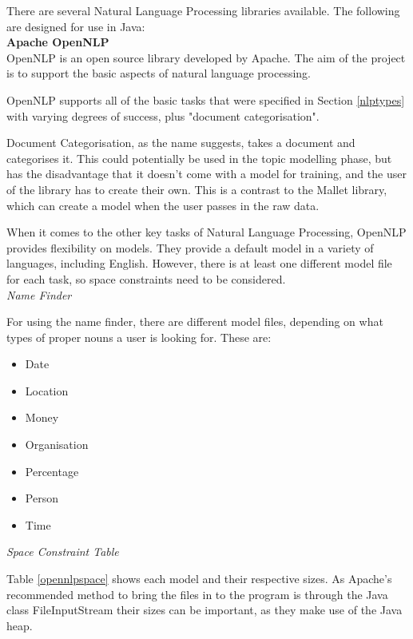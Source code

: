 \documentclass[12pt]{article}
\begin{document}
\label{nlp}

There are several Natural Language Processing libraries available. The following are designed for use in Java: \\

\textbf{Apache OpenNLP} \\

OpenNLP is an open source library developed by Apache. The aim of the project is to support the basic aspects of natural language processing.

OpenNLP supports all of the basic tasks that were specified in Section \ref{nlptypes} with varying degrees of success, plus "document categorisation".

Document Categorisation, as the name suggests, takes a document and categorises it. This could potentially be used in the topic modelling phase, but has the disadvantage that it doesn't come with a model for training, and the user of the library has to create their own. This is a contrast to the Mallet library, which can create a model when the user passes in the raw data.

When it comes to the other key tasks of Natural Language Processing, OpenNLP provides flexibility on models. They provide a default model in a variety of languages, including English. However, there is at least one different model file for each task, so space constraints need to be considered. \\

\emph{Name Finder}

For using the name finder, there are different model files, depending on what types of proper nouns a user is looking for. These are: 

\begin{itemize}
	\item Date
	\item Location
	\item Money
	\item Organisation
	\item Percentage
	\item Person
	\item Time \\
\end{itemize} 

\emph{Space Constraint Table}

Table \ref{opennlpspace} shows each model and their respective sizes. As Apache's recommended method to bring the files in to the program is through the Java class FileInputStream their sizes can be important, as they make use of the Java heap.
\end{document}
